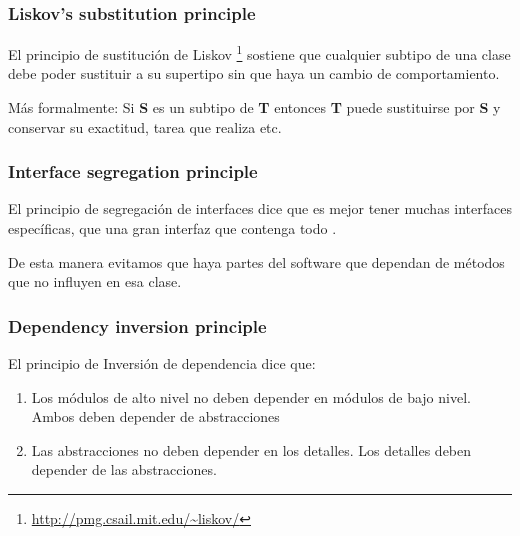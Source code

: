 \subsubsection{Liskov's substitution principle}
El principio de sustituci\'{o}n de Liskov \cite{SOLID:LSP} \footnote{\url{http://pmg.csail.mit.edu/~liskov/}} 
sostiene que cualquier subtipo de una clase
debe poder sustituir a su supertipo sin que haya un cambio de comportamiento.

M\'{a}s formalmente: Si \textbf{S} es un subtipo de \textbf{T} entonces \textbf{T} puede sustituirse por \textbf{S} y 
conservar su exactitud, tarea que realiza etc.

\subsubsection{Interface segregation principle}
El principio de segregaci\'{o}n de interfaces dice que es mejor tener muchas interfaces espec\'{i}ficas, 
que una gran interfaz que contenga todo \cite{SOLID:ISP}.

De esta manera evitamos que haya partes del software que dependan de m\'{e}todos que no influyen en esa clase.

\subsubsection{Dependency inversion principle}
El principio de Inversi\'{o}n de dependencia dice que:
\begin{enumerate}
    \item Los m\'{o}dulos de alto nivel no deben depender en m\'{o}dulos de bajo nivel. Ambos deben depender de abstracciones
    \item Las abstracciones no deben depender en los detalles. Los detalles deben depender de las abstracciones.
\end{enumerate}
\cite{SOLID:DIP}
